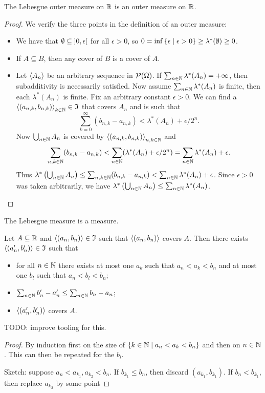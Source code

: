 \begin{lemma} \label{LebesgueOuterMeasureOuterMeasure}
The Lebesgue outer measure on $\mathbb{R}$ is an outer measure on $\mathbb{R}$.
\end{lemma}
\begin{proof}
We verify the three points in the definition of an outer measure:
\begin{itemize}
\item We have that $\emptyset \subseteq \interval[o]{0,\epsilon}$ for all $\epsilon > 0$, so  $0 = \inf\setbuilder{\epsilon}{\epsilon > 0} \geq \lambda^*(\emptyset) \geq 0$.
\item If $A\subseteq B$, then any cover of $B$ is a cover of $A$.
\item Let $\left\langle A_n \right\rangle$ be an arbitrary sequence in $\operatorname{\mathcal{P}}(\Omega)$. If $\sum_{n\in\mathbb{N}}\lambda^*(A_n) = +\infty$, then subadditivity is necessarily satisfied. Now assume $\sum_{n\in\mathbb{N}}\lambda^*(A_n)$ is finite, then each $\lambda^*(A_n)$ is finite. Fix an arbitrary constant $\epsilon > 0$. We can find a $\left\langle (a_{n,k},b_{n,k}) \right\rangle_{k\in\mathbb{N}}\in \mathfrak{I}$ that covers $A_n$ and is such that
\[ \sum_{k=0}^\infty(b_{n,k} - a_{n,k}) < \lambda^*(A_n) + \epsilon/2^n. \]
Now $\bigcup_{n\in \mathbb{N}}A_n$ is covered by $\left\langle (a_{n,k},b_{n,k}) \right\rangle_{n,k\in\mathbb{N}}$ and
\[ \sum_{n,k \in\mathbb{N}} (b_{n,k} - a_{n,k}) < \sum_{n\in \mathbb{N}}(\lambda^*(A_n) + \epsilon/2^n) = \sum_{n\in \mathbb{N}}\lambda^*(A_n) + \epsilon. \]
Thus $\lambda^*\left(\bigcup_{n\in \mathbb{N}}A_n\right) \leq \sum_{n,k \in\mathbb{N}} (b_{n,k} - a_{n,k}) < \sum_{n\in \mathbb{N}}\lambda^*(A_n) + \epsilon$. Since $\epsilon > 0$ was taken arbitrarily, we have  $\lambda^*\left(\bigcup_{n\in \mathbb{N}}A_n\right) \leq \sum_{n\in \mathbb{N}}\lambda^*(A_n)$.
\end{itemize}
\end{proof}
\begin{corollary} \label{LebesgueMesaureIsMeasure}
The Lebesgue measure is a measure.
\end{corollary}

\begin{lemma}
Let $A\subseteq \mathbb{R}$ and $\left\langle (a_n, b_n) \right\rangle\in \mathfrak{I}$ such that $\left\langle (a_n, b_n) \right\rangle$ covers $A$. Then there exists $\left\langle (a'_n, b'_n) \right\rangle\in \mathfrak{I}$ such that
\begin{itemize}
\item for all $n\in \mathbb{N}$ there exists at most one $a_k$ such that $a_n < a_k < b_n$ and at most one $b_l$ such that $a_n < b_l < b_n$;
\item $\sum_{n\in \mathbb{N}}b'_n - a'_n \leq \sum_{n\in \mathbb{N}}b_n - a_n$;
\item $\left\langle (a'_n, b'_n) \right\rangle$ covers $A$.
\end{itemize}
\end{lemma}
TODO: improve tooling for this.
\begin{proof}
By induction first on the size of $\setbuilder{k\in \N}{a_n < a_k < b_n}$ and then on $n\in\mathbb{N}$. This can then be repeated for the $b_l$.

Sketch: suppose $a_n < a_{k_1}, a_{k_2} < b_n$. If $b_{k_1} \leq b_{n}$, then discard $(a_{k_1}, b_{k_1})$. If $b_n < b_{k_1}$, then replace $a_{k_2}$ by some point
\end{proof}

